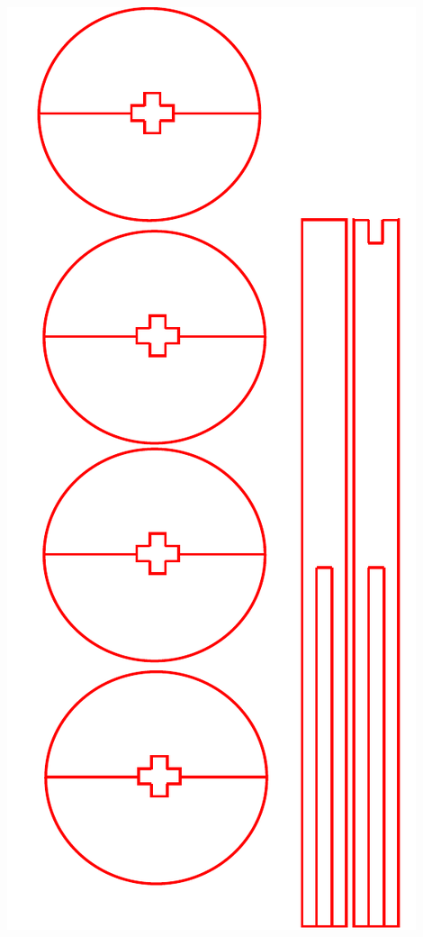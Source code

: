 \begin{center}
\includegraphics[height=0.3\textheight, angle = 0]{src/ontwerp/Spoel.pdf}
\end{center}

